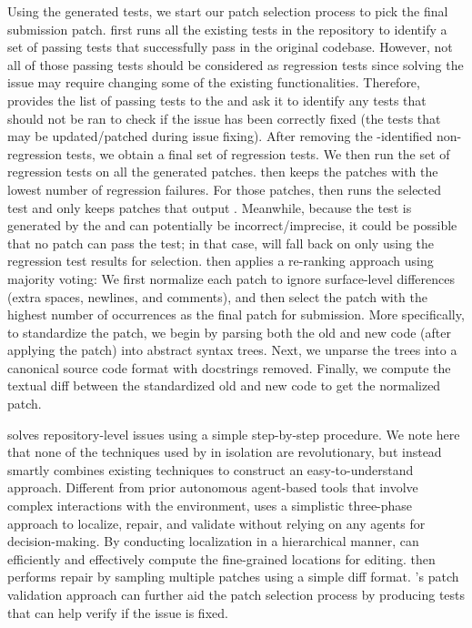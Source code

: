 Using the generated \reproduction tests, we start our patch selection process to pick the final submission patch.
%
\tech first runs all the existing tests in the repository to identify a set of passing tests that successfully pass in the original codebase. 
However, not all of those passing tests should be considered as regression tests since solving the issue may require changing some of the existing functionalities. 
Therefore, \tech provides the list of passing tests to the \llm and ask it to identify any tests that should not be ran to check if the issue has been correctly fixed (\ie the tests that may be updated/patched during issue fixing). 
After removing the \llm-identified non-regression tests, we obtain a final set of regression tests. 
We then run the set of regression tests on all the generated patches. 
\tech then keeps the patches with the lowest number of regression failures.
For those patches, \tech then runs the selected \reproduction test and only keeps patches that output .
Meanwhile, because the \reproduction test is generated by the \llm and can potentially be incorrect/imprecise, it could be possible that no patch can pass the \reproduction test; in that case, \tech will fall back on only using the regression test results for selection.
\tech then applies a re-ranking approach using majority voting:
We first normalize each patch to ignore surface-level differences (\eg extra spaces, newlines, and comments), and then select the patch with the highest number of occurrences as the final patch for submission. 
More specifically, to standardize the patch, we begin by parsing both the old and new code (after applying the patch) into abstract syntax trees. Next, we unparse the trees into a canonical source code format with docstrings removed. Finally, we compute the textual diff between the standardized old and new code to get the normalized patch.

\tech solves repository-level issues using a simple step-by-step procedure.
We note here that none of the techniques used by \tech in isolation are{ revolutionary},
but instead \tech smartly combines existing techniques to construct an easy-to-understand approach. 
Different from prior autonomous agent-based tools that involve complex interactions with the environment, \tech uses{ a simplistic} three-phase approach to localize, repair, and validate without relying on any agents for decision-making.
By conducting localization in a hierarchical manner, \tech can efficiently and effectively compute the fine-grained locations for editing. 
\tech then performs repair by sampling multiple patches using a simple diff format.
\tech's patch validation approach can further aid the patch selection process by producing \reproduction tests that can help verify if the issue is fixed. 


